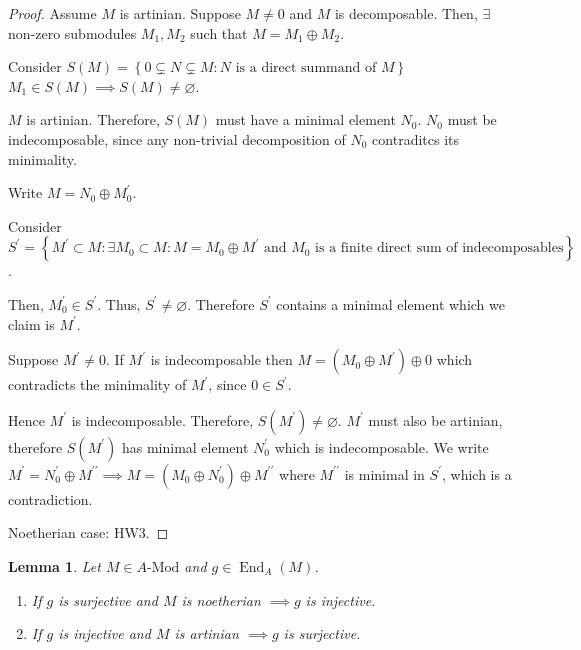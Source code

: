 \documentclass{article}
\theoremstyle{definition}
\theoremstyle{plain}
\newtheorem{lemma}[theorem]{Lemma}
\theoremstyle{remark}
\begin{document}
    \begin{proof}
        Assume \(M\) is artinian. Suppose \(M\neq 0\) and \(M\) is decomposable. Then, \(\exists\) non-zero submodules \(M_1, M_2\) such that \(M = M_1 \oplus M_2\).
        
        Consider \(S(M) = \left\{ 0 \subsetneq N \subsetneq M : N \text{ is a direct summand of } M \right\} \) \(M_1 \in S(M) \implies S(M) \neq \varnothing\).

        \(M\) is artinian. Therefore, \(S(M)\) must have a minimal element \(N_0\). \(N_0\) must be indecomposable, since any non-trivial decomposition of \(N_0\) contraditcs its minimality.

        Write \(M = N_0 \oplus M_0^{\prime}\). 

        Consider \(S^{\prime} = \left\{ M^{\prime} \subset M : \exists M_0 \subset M : M = M_0 \oplus M^{\prime} \text{ and } M_0 \text{ is a finite direct sum of indecomposables}  \right\} \).

        Then, \(M^{\prime}_0 \in S^{\prime}\). Thus, \(S^{\prime} \neq \varnothing\). Therefore \(S^{\prime}\) contains a minimal element which we claim is \(M^{\prime}\).

        Suppose \(M^{\prime} \neq 0\). If \(M^{\prime}\) is indecomposable then \(M = (M_0 \oplus M^{\prime}) \oplus 0\) which contradicts the minimality of \(M^{\prime}\), since \(0 \in  S^{\prime}\).
        
        Hence \(M^{\prime}\) is indecomposable. Therefore, \(S(M^{\prime}) \neq \varnothing\). \(M^{\prime}\) must also be artinian, therefore \(S(M^{\prime})\) has minimal element \(N^{\prime}_0\) which is indecomposable. We write \(M^{\prime} = N^{\prime}_0 \oplus M^{\prime\prime} \implies M = (M_0 \oplus N^{\prime}_0) \oplus M^{\prime\prime}\) where \(M^{\prime\prime}\) is minimal in \(S^{\prime}\), which is a contradiction.

        Noetherian case: HW3.
    \end{proof}

    \begin{lemma}
        Let \(M \in A\text{-Mod}\) and \(g\in \operatorname{End}_A(M)\).

        \begin{enumerate}[label=\roman*)]
            \item If \(g\) is surjective and \(M\) is noetherian \(\implies g\) is injective.
            \item If \(g\) is injective and \(M\) is artinian \(\implies g\) is surjective.
        \end{enumerate} 
    \end{lemma}
\end{document}
